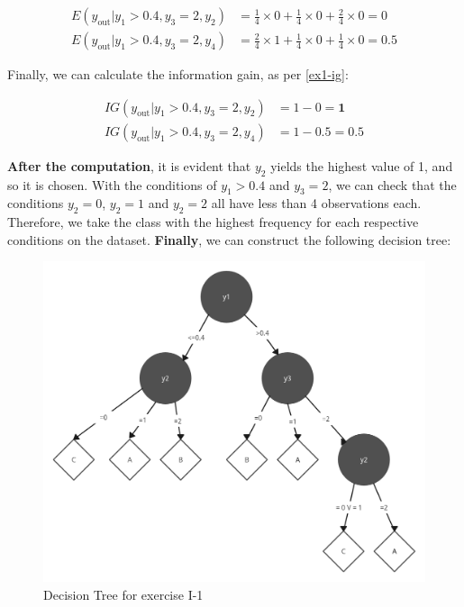 \documentclass[12pt]{article}
\begin{document}
\begin{enumerate}[leftmargin=\labelsep]
        \[
          \begin{aligned}
            E(y_{\text{out}} | y_1>0.4, y_3 = 2, y_2) & = \frac{1}{4} \times 0 + \frac{1}{4} \times 0 + \frac{2}{4} \times 0 = 0   \\
            E(y_{\text{out}} | y_1>0.4, y_3 = 2, y_4) & = \frac{2}{4} \times 1 + \frac{1}{4} \times 0 + \frac{1}{4} \times 0 = 0.5
          \end{aligned}
        \]

        Finally, we can calculate the information gain, as per \eqref{ex1-ig}:

        \[
          \begin{aligned}
            IG(y_{\text{out}} |y_1 > 0.4, y_3 = 2, y_2) & = 1 - 0 = \textbf{1} \\
            IG(y_{\text{out}} |y_1 > 0.4, y_3 = 2, y_4) & = 1 - 0.5 = 0.5
          \end{aligned}
        \]

        \textbf{After the computation}, it is evident that $y_2$ yields the highest value of 1, and so it is chosen. With the conditions of $y_1 > 0.4$ and $y_3 = 2$, we
        can check that the conditions $y_2 = 0$, $y_2 = 1$ and $y_2 = 2$ all have less than 4 observations each. Therefore, we take the class with the highest frequency
        for each respective conditions on the dataset. \textbf{Finally}, we can construct the following decision tree:

        \begin{figure}[H]
          \centering
          \includegraphics[width=12cm]{./assets/decision_tree_ex1_PartI.png}
          \caption{Decision Tree for exercise I-1}
          \label{fig:decision_tree}
        \end{figure}


\end{enumerate}
\end{document}
